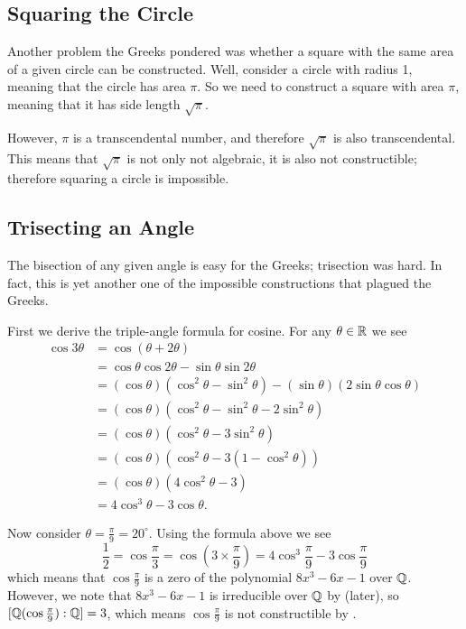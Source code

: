 \subsection{Squaring the Circle}
Another problem the Greeks pondered was whether a square with the same area of a given circle can be constructed. Well, consider a circle with radius 1, meaning that the circle has area $\pi$. So we need to construct a square with area $\pi$, meaning that it has side length $\sqrt\pi$.

However, $\pi$ is a transcendental number, and therefore $\sqrt\pi$ is also transcendental. This means that $\sqrt\pi$ is not only not algebraic, it is also not constructible; therefore squaring a circle is impossible.

\subsection{Trisecting an Angle}
The bisection of any given angle is easy for the Greeks; trisection was hard. In fact, this is yet another one of the impossible constructions that plagued the Greeks.

First we derive the triple-angle formula for cosine. For any $\theta \in \mathbb{R}$ we see
\begin{align*}
    \cos3\theta &= \cos(\theta + 2\theta)\\
    &= \cos\theta\cos2\theta - \sin\theta\sin2\theta\\
    &= (\cos\theta)(\cos^2\theta-\sin^2\theta) - (\sin\theta)(2\sin\theta\cos\theta)\\
    &= (\cos\theta)(\cos^2\theta - \sin^2\theta - 2\sin^2\theta)\\
    &= (\cos\theta)(\cos^2\theta - 3\sin^2\theta)\\
    &= (\cos\theta)(\cos^2\theta - 3(1-\cos^2\theta))\\
    &= (\cos\theta)(4\cos^2\theta - 3)\\
    &= 4\cos^3\theta - 3\cos\theta.
\end{align*}

Now consider $\theta = \frac{\pi}{9} = 20^\circ$. Using the formula above we see
\[
    \frac12 = \cos\frac\pi3 = \cos(3\times\frac\pi9) = 4\cos^3\frac\pi9 - 3\cos\frac\pi9
\]
which means that $\cos\frac\pi9$ is a zero of the polynomial $8x^3 - 6x - 1$ over $\mathbb{Q}$. However, we note that $8x^3 - 6x - 1$ is irreducible over $\mathbb{Q}$ by  (later), so $[\mathbb{Q}(\cos\frac\pi9): \mathbb{Q}] = 3$, which means $\cos\frac\pi9$ is not constructible by .

